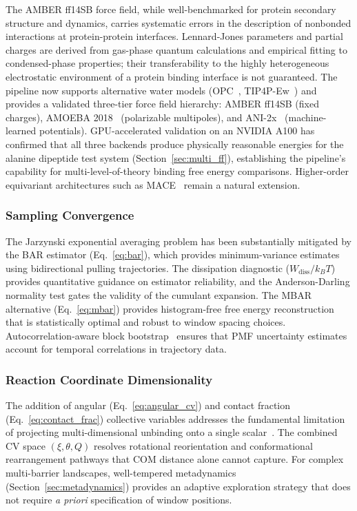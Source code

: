 \documentclass[conference]{IEEEtran}
\begin{document}
The AMBER ff14SB force field, while well-benchmarked for protein secondary
structure and dynamics, carries systematic errors in the description of
nonbonded interactions at protein-protein interfaces.  Lennard-Jones
parameters and partial charges are derived from gas-phase quantum
calculations and empirical fitting to condensed-phase properties; their
transferability to the highly heterogeneous electrostatic environment of a
protein binding interface is not guaranteed.  The pipeline now supports
alternative water models (OPC~\cite{izadi2014}, TIP4P-Ew~\cite{horn2004})
and provides a validated three-tier force field hierarchy: AMBER ff14SB
(fixed charges), AMOEBA 2018~\cite{ponder2010} (polarizable multipoles),
and ANI-2x~\cite{devereux2020} (machine-learned potentials).  GPU-accelerated
validation on an NVIDIA A100 has confirmed that all three backends produce
physically reasonable energies for the alanine dipeptide test system
(Section~\ref{sec:multi_ff}), establishing the pipeline's capability for
multi-level-of-theory binding free energy comparisons.  Higher-order
equivariant architectures such as MACE~\cite{batatia2022} remain a
natural extension.

\subsubsection{Sampling Convergence}

The Jarzynski exponential averaging problem has been substantially
mitigated by the BAR estimator (Eq.~\ref{eq:bar}), which provides
minimum-variance estimates using bidirectional pulling trajectories.
The dissipation diagnostic ($W_{\mathrm{diss}} / k_B T$) provides
quantitative guidance on estimator reliability, and the Anderson-Darling
normality test gates the validity of the cumulant expansion.  The MBAR
alternative (Eq.~\ref{eq:mbar}) provides histogram-free free energy
reconstruction that is statistically optimal and robust to window spacing
choices.  Autocorrelation-aware block bootstrap~\cite{kuensch1989} ensures
that PMF uncertainty estimates account for temporal correlations in
trajectory data.

\subsubsection{Reaction Coordinate Dimensionality}

The addition of angular (Eq.~\ref{eq:angular_cv}) and contact fraction
(Eq.~\ref{eq:contact_frac}) collective variables addresses the fundamental
limitation of projecting multi-dimensional unbinding onto a single
scalar~\cite{chodera2007,branduardi2007}.  The combined CV space
$(\xi, \theta, Q)$ resolves rotational reorientation and conformational
rearrangement pathways that COM distance alone cannot capture.  For
complex multi-barrier landscapes, well-tempered metadynamics
(Section~\ref{sec:metadynamics}) provides an adaptive exploration strategy
that does not require \textit{a priori} specification of window positions.
\end{document}
